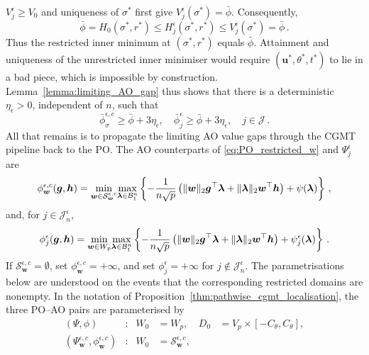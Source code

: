 \documentclass{article}
\makeatletter
\theoremstyle{definition}
\newcommand{\vnorm}[1]{%
	\ensuremath{%
		\if@display
		\left\| #1 \right\|
		\else
		\| #1 \|
		\fi
	}%
}
\newcommand*{\bb}{\boldsymbol}
\def\bw {\bb{w}}
\def\bu{\bb{u}}
\def\bh{\bb{h}}
\def\bg{\bb{g}}
\def\blambda{\bb{\lambda}}
\makeatother
\begin{document}
\begin{bibunit}
$V_j^\epsilon\geq V_0$ and uniqueness of $\sigma^*$ first give
$V_j^\epsilon(\sigma^*)=\bar\phi$. Consequently,
$$
    \bar\phi
    =
    H_0(\sigma^*,r^*)
    \leq
    H_j^\epsilon(\sigma^*,r^*)
    \leq
    V_j^\epsilon(\sigma^*)
    =
    \bar\phi\,.
$$
Thus the restricted inner minimum at $(\sigma^*,r^*)$ equals
$\bar\phi$. Attainment and uniqueness of the unrestricted inner
minimiser would require $(\bu^*,\theta^*,t^*)$ to lie in a bad piece, which
is impossible by construction. 
Lemma~\ref{lemma:limiting_AO_gap} thus shows that there is a deterministic $\eta_\epsilon>0$, independent of
$n$, such that
\begin{equation}
\label{eq:limiting_barriers}
    \bar\phi_{\sigma}^{\epsilon,c}
    \geq
    \bar\phi+3\eta_\epsilon,
    \quad
    \bar\phi_j^\epsilon
    \geq
    \bar\phi+3\eta_\epsilon,
    \quad
    j\in\mathcal J \,.
\end{equation}
All that remains is to propagate the limiting AO value gaps through the CGMT pipeline back to the 
PO. The AO counterparts of \eqref{eq:PO_restricted_w} and $\Psi_j^\epsilon$ are
$$
    \phi_{\bw}^{\epsilon,c}(\bg,\bh)
    =
    \underset{\bw\in\mathcal S_{\bw}^{\epsilon,c}}{\min}
    \underset{\blambda\in\mathcal B^n_1}{\max}
    \left\{
        -\frac1{n\sqrt p}
        \left(
            \vnorm{\bw}_2\bg^\top\blambda
            +
            \vnorm{\blambda}_2\bw^\top\bh
        \right)
        +
        \psi(\blambda)
    \right\}\,,
$$
and, for $j\in\mathcal J_n^\epsilon$,
$$
    \phi_j^\epsilon(\bg,\bh)
    =
    \underset{\bw\in W_p}{\min}
    \underset{\blambda\in\mathcal B^n_1}{\max}
    \left\{
        -\frac1{n\sqrt p}
        \left(
            \vnorm{\bw}_2\bg^\top\blambda
            +
            \vnorm{\blambda}_2\bw^\top\bh
        \right)
        +
        \psi_j^\epsilon(\blambda)
    \right\} \,.
$$
If $\mathcal S_{\bw}^{\epsilon,c}=\emptyset$, set
$\phi_{\bw}^{\epsilon,c}=+\infty$, and set $\phi_j^\epsilon=+\infty$ for
$j\notin\mathcal J_n^\epsilon$. The parametrisations below are
understood on the events that the corresponding restricted domains are
nonempty. In the notation of
Proposition~\ref{thm:pathwise_cgmt_localisation}, the three PO--AO pairs
are parameterised by
\begin{equation}
\label{eq:restricted_po_ao_pairs}
\begin{aligned}
    (\Psi,\phi)
    &: &
    W_0&=W_p,
    &
    D_0&=V_p\times[-C_\theta,C_\theta],
    \\
    (\Psi_{\bw}^{\epsilon,c},\phi_{\bw}^{\epsilon,c})
    &: &
    W_0&=\mathcal S_{\bw}^{\epsilon,c},

\end{aligned}
\end{equation}
\end{bibunit}
\end{document}
